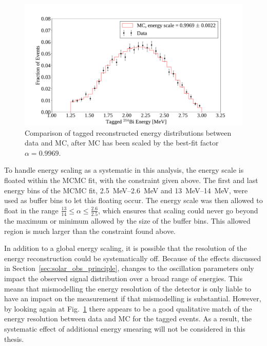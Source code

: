 \begin{figure}
    \centering
    \includegraphics[width=\textwidth]{6_SolarAnalysis/images/rafael_tagged_bi214_data_vs_mc_energy_comparison_resized.pdf}
    \caption[Comparison of tagged  reconstructed energy distributions between data and MC]
    {Comparison of tagged  reconstructed energy distributions between data and MC, after MC has been scaled by the best-fit factor $\alpha = 0.9969$.}
    \label{fig:bi214_escale_calibration}
\end{figure}

To handle energy scaling as a systematic in this analysis, the energy scale is floated within the MCMC fit, with the constraint given above. The first and last energy bins of the MCMC fit, \SIrange{2.5}{2.6}{\MeV} and \SIrange{13}{14}{\MeV}, were used as buffer bins to let this floating occur.
The energy scale was then allowed to float in the range $\frac{13}{14}\leq\alpha\leq\frac{2.6}{2.5}$, which ensures that scaling could never go beyond the maximum or minimum allowed by the size of the buffer bins. This allowed region is much larger than the constraint found above.

In addition to a global energy scaling, it is possible that the resolution of the energy reconstruction could be systematically off. Because of the effects discussed in Section~\ref{sec:solar_obs_principle}, changes to the oscillation parameters only impact the observed signal distribution over a broad range of energies. This means that mismodelling the energy resolution of the detector is only liable to have an impact on the measurement if that mismodelling is substantial. However, by looking again at Fig.~\ref{fig:bi214_escale_calibration} there appears to be a good qualitative match of the energy resolution between data and MC for the tagged  events. As a result, the systematic effect of additional energy smearing will not be considered in this thesis.

